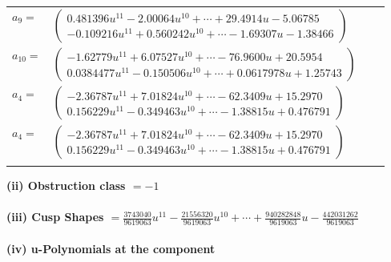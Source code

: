 \documentclass[1p]{elsarticle_modified}
\theoremstyle{definition}
\begin{document}
\begin{tabular}{m{7pt} m{180pt} m{7pt} m{180pt} }
\flushright $a_{9}=$&$\begin{pmatrix}0.481396 u^{11}-2.00064 u^{10}+\cdots+29.4914 u-5.06785\\-0.109216 u^{11}+0.560242 u^{10}+\cdots-1.69307 u-1.38466\end{pmatrix}$ \\
\flushright $a_{10}=$&$\begin{pmatrix}-1.62779 u^{11}+6.07527 u^{10}+\cdots-76.9600 u+20.5954\\0.0384477 u^{11}-0.150506 u^{10}+\cdots+0.0617978 u+1.25743\end{pmatrix}$ \\
\flushright $a_{4}=$&$\begin{pmatrix}-2.36787 u^{11}+7.01824 u^{10}+\cdots-62.3409 u+15.2970\\0.156229 u^{11}-0.349463 u^{10}+\cdots-1.38815 u+0.476791\end{pmatrix}$\\ \flushright $a_{4}=$&$\begin{pmatrix}-2.36787 u^{11}+7.01824 u^{10}+\cdots-62.3409 u+15.2970\\0.156229 u^{11}-0.349463 u^{10}+\cdots-1.38815 u+0.476791\end{pmatrix}$\\&\end{tabular}
\flushleft \textbf{(ii) Obstruction class $= -1$}\\~\\
\flushleft \textbf{(iii) Cusp Shapes $= \frac{3743040}{9619063} u^{11}-\frac{21556320}{9619063} u^{10}+\cdots+\frac{940282848}{9619063} u-\frac{442031262}{9619063}$}\\~\\
\newpage\renewcommand{\arraystretch}{1}
\flushleft \textbf{(iv) u-Polynomials at the component}\newline \\
\end{document}
